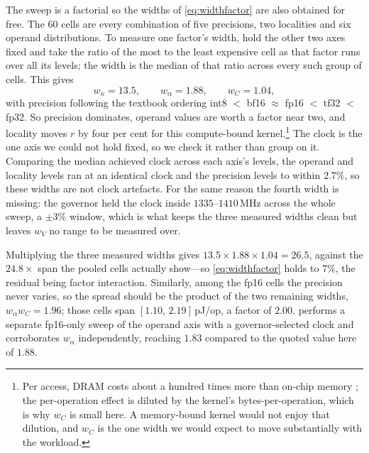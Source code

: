 \documentclass{article}
\theoremstyle{plain}
\theoremstyle{definition}
\theoremstyle{remark}
\begin{document}
The sweep is a factorial so the widths of \cref{eq:widthfactor} are also obtained for free.
The $60$ cells are every combination of five
precisions, two localities and six operand distributions. To measure one
factor's width, hold the other two axes fixed and take the ratio of the most to
the least expensive cell as that factor runs over all its levels; the width is
the median of that ratio across every such group of cells. This gives
\begin{equation}
	w_\kappa = 13.5, \qquad w_\alpha = 1.88, \qquad w_C = 1.04,
	\label{eq:measuredwidths}
\end{equation}
with precision following the textbook ordering
int8 $<$ bf16 $\approx$ fp16 $<$ tf32 $<$ fp32. So precision dominates, operand
values are worth a factor near two, and locality moves $r$ by four per cent for
this compute-bound kernel.\footnote{Per access, DRAM costs about a hundred times more than on-chip
memory \citep{horowitz2014computing}; the per-operation effect is diluted by the
kernel's bytes-per-operation, which is why $w_C$ is small here. A memory-bound
kernel would not enjoy that dilution, and $w_C$ is the one width we would expect
to move substantially with the workload.} The clock is the one axis we could not hold fixed, so we check it rather than
group on it. Comparing the median achieved clock across each axis's levels,
the operand and locality levels ran at an identical clock and the precision
levels to within $2.7\%$, so these widths are not clock artefacts. For the same
reason the fourth width is missing: the governor held the clock inside
$1335$--$1410$\,MHz across the whole sweep, a $\pm 3\%$ window, which is what
keeps the three measured widths clean but leaves $w_V$ no range to be measured
over. 

Multiplying the three measured widths gives
$13.5 \times 1.88 \times 1.04 = 26.5$, against the $24.8\times$ span the pooled
cells actually show---so \cref{eq:widthfactor} holds to $7\%$, the residual
being factor interaction. Similarly, among the fp16 cells the precision never varies, so
the spread should be the product of the two remaining widths,
$w_\alpha w_C = 1.96$; those cells span $[1.10,\,2.19]$\,pJ/op, a factor of
$2.00$.  performs a separate fp16-only sweep of the operand axis with a governor-selected clock and corroborates $w_\alpha$ independently, reaching $1.83$ compared to the quoted value here of $1.88$.
\end{document}
